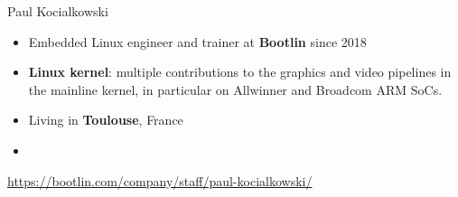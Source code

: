 \begin{frame}{Paul Kocialkowski}
    \begin{itemize}
        \item Embedded Linux engineer and trainer at {\bf Bootlin}
              since 2018
        \item {\bf Linux kernel}: multiple contributions to the graphics
              and video pipelines in the mainline kernel, in particular
              on Allwinner and Broadcom ARM SoCs.
        \item Living in {\bf Toulouse}, France
        \item {}
    \end{itemize}
    {\small \url{https://bootlin.com/company/staff/paul-kocialkowski/}}
\end{frame}
